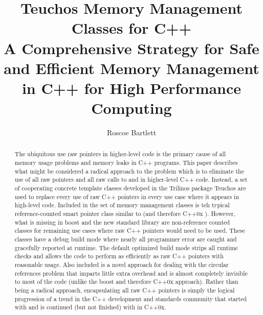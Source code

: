 \documentclass[pdf,ps2pdf,11pt]{SANDreport}
\title{\center
Teuchos Memory Management Classes for C++ \\[2ex] A Comprehensive
Strategy for Safe and Efficient Memory Management in C++ for High
Performance Computing }
\author{
Roscoe Bartlett
}
\date{}
\begin{document}

\maketitle


%


%
\begin{abstract}
%


The ubiquitous use raw pointers in higher-level code is the primary
cause of all memory usage problems and memory leaks in C++
programs. This paper describes what might be considered a radical
approach to the problem which is to eliminate the use of all raw
pointers and all raw calls to {} and {} in
higher-level C++ code.  Instead, a set of cooperating concrete
template classes developed in the Trilinos package Teuchos are used to
replace every use of raw C++ pointers in every use case where it
appears in high-level code.  Included in the set of memory management
classes is teh typical reference-counted smart pointer class similar
to {} (and therefore C++0x
{}).  However, what is missing in boost and the
new standard library are non-reference counted classes for remaining
use cases where raw C++ pointers would need to be used.  These classes
have a debug build mode where nearly all programmer error are caught
and gracefully reported at runtime.  The default optimized build mode
strips all runtime checks and allows the code to perform as
efficiently as raw C++ pointers with reasonable usage.  Also included
is a novel approach for dealing with the circular references problem
that imparts little extra overhead and is almost completely invisible
to most of the code (unlike the boost and therefore C++0x approach).
Rather than being a radical approach, encapsulating all raw C++
pointers is simply the logical progression of a trend in the C++
development and standards community that started with
{} and is continued (but not finished) with
{} in C++0x.

%
\end{abstract}
%

%
%
%
\end{document}
